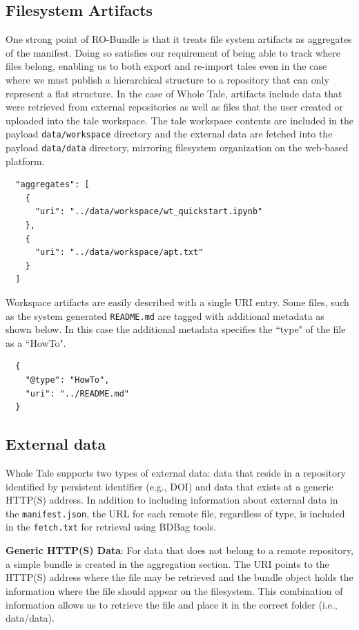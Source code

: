\documentclass[conference]{IEEEtran}
\begin{document}
\subsection{Filesystem Artifacts}
One strong point of RO-Bundle is that it treats file system artifacts as aggregates of the 
manifest. Doing so satisfies our requirement of being able to track where files belong, enabling 
us to both export and re-import tales even in the case where we must publish a hierarchical 
structure to a repository that can only represent a flat structure. In the case of Whole Tale, 
artifacts include data that were retrieved from external repositories as well as files that the user created or uploaded into the tale workspace. The tale workspace contents are included in the payload \texttt{data/workspace} directory and the external data are fetched into the payload \texttt{data/data} directory, mirroring filesystem organization on the web-based platform.

\begin{lstlisting}
  "aggregates": [
    {
      "uri": "../data/workspace/wt_quickstart.ipynb"
    },
    {
      "uri": "../data/workspace/apt.txt"
    }
  ]
\end{lstlisting}

Workspace artifacts are easily described with a single URI entry. Some files, such as the 
system generated \texttt{README.md} are tagged with additional metadata as shown below. In this case the 
additional metadata specifies the ``type" of the file as a ``HowTo".

\begin{lstlisting}
  {
    "@type": "HowTo",
    "uri": "../README.md"
  }
\end{lstlisting}

\subsection{External data}

Whole Tale supports two types of external data: data that reside in a repository identified by persistent identifier (e.g., DOI) and data that exists at a generic HTTP(S) address. In addition to 
including information about external data in the \texttt{manifest.json}, the URL for each remote file, regardless of type, is included in the \texttt{fetch.txt} for retrieval using BDBag tools.

{\bf Generic HTTP(S) Data}:
For data that does not belong to a remote repository, a simple bundle is created in the aggregation section. The URI points to the HTTP(S) address where the file may be retrieved and the bundle object holds the information where the file should appear on the filesystem. This combination of information allows us to retrieve the file and place it in the correct folder (i.e., data/data).
\end{document}
